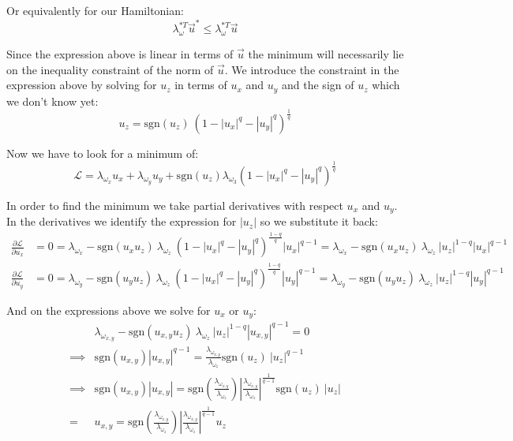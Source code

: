 Or equivalently for our Hamiltonian:
\begin{equation}
\lambda_\omega^{*T} \vec{u}^* \leq \lambda_\omega^{*T} \vec{u}
\end{equation}

Since the expression above is linear in terms of $\vec{u}$ the minimum will necessarily lie on the inequality constraint of the norm of $\vec{u}$. We introduce the constraint in the expression above by solving for $u_z$ in terms of $u_x$ and $u_y$ and the sign of $u_z$ which we don't know yet:
\begin{equation}
\label{uzFromNorm}
u_z = \text{sgn}(u_z) \ (1 - |u_x|^q - |u_y|^q)^{\frac{1}{q}}
\end{equation}

Now we have to look for a minimum of:
\begin{equation}
\label{unconstrainedOptimalControl}
\mathcal{L} = \lambda_{\omega_x} u_x + \lambda_{\omega_y} u_y + \text{sgn}(u_z) \lambda_{\omega_3} (1 - |u_x|^q - |u_y|^q)^{\frac{1}{q}}
\end{equation}

In order to find the minimum we take partial derivatives with respect $u_x$ and $u_y$. In the derivatives we identify the expression for $|u_z|$ so we substitute it back: 
\begin{align}
\label{partialLx}
\frac{\partial \mathcal{L}}{\partial u_x} &= 0 =\lambda_{\omega_x} - \text{sgn}(u_x u_z) \ \lambda_{\omega_z} \ (1 - |u_x|^q - |u_y|^q)^{\frac{1-q}{q}} |u_x|^{q-1} = \lambda_{\omega_x} - \text{sgn}(u_x u_z) \ \lambda_{\omega_z} \ |u_z|^{1-q} |u_x|^{q-1}\\
\label{partialLy}
\frac{\partial \mathcal{L}}{\partial u_y} &= 0 = \lambda_{\omega_y} - \text{sgn}(u_y u_z) \ \lambda_{\omega_z} \ (1 - |u_x|^q - |u_y|^q)^{\frac{1-q}{q}} |u_y|^{q-1} = \lambda_{\omega_y} - \text{sgn}(u_y u_z) \ \lambda_{\omega_z} \ |u_z|^{1-q} |u_y|^{q-1}
\end{align}

And on the expressions above we solve for $u_x$ or $u_y$:
\begin{align}
&\lambda_{\omega_{x,y}} - \text{sgn}(u_{x,y} u_z) \ \lambda_{\omega_z} \ |u_z|^{1-q} |u_{x,y}|^{q-1} = 0 \\
\implies &
\text{sgn}(u_{x,y}) |u_{x,y}|^{q-1} = \frac{\lambda_{\omega_{x,y}}}{\lambda_{\omega_z}} \text{sgn}(u_z) \ |u_z|^{q-1} \\
\implies &
\text{sgn}(u_{x,y}) |u_{x,y}| = \text{sgn}\left(\frac{\lambda_{\omega_{x,y}}}{\lambda_{\omega_z}}\right) \left|\frac{\lambda_{\omega_{x,y}}}{\lambda_{\omega_z}}\right|^{\frac{1}{q-1}}
 \text{sgn}(u_z) \ |u_z| \\
= &
\label{uxyFromuz}
u_{x,y} = \text{sgn}\left(\frac{\lambda_{\omega_{x,y}}}{\lambda_{\omega_z}}\right) \left|\frac{\lambda_{\omega_{x,y}}}{\lambda_{\omega_z}}\right|^{\frac{1}{q-1}}
u_z
\end{align}

